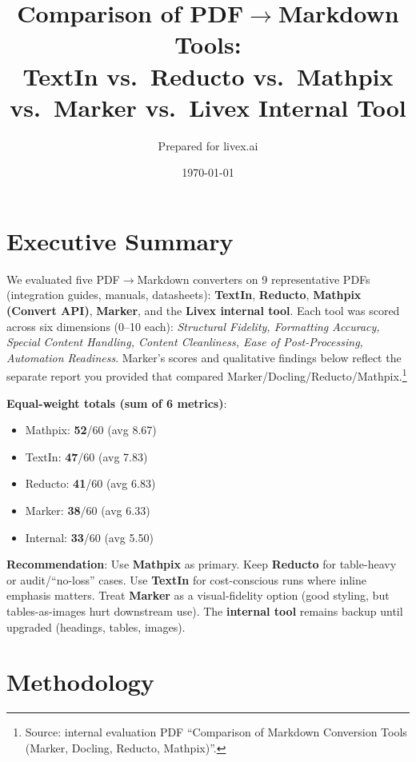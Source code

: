 \documentclass[11pt,a4paper]{article}
\title{Comparison of PDF\texorpdfstring{$\to$}{->}Markdown Tools:\\
TextIn vs.\ Reducto vs.\ Mathpix vs.\ Marker vs.\ Livex Internal Tool}
\author{Prepared for livex.ai}
\date{\today}
\begin{document}
\maketitle

\section*{Executive Summary}

We evaluated five PDF$\to$Markdown converters on 9 representative PDFs (integration guides, manuals, datasheets):
\textbf{TextIn}, \textbf{Reducto}, \textbf{Mathpix (Convert API)}, \textbf{Marker}, and the \textbf{Livex internal tool}.
Each tool was scored across six dimensions (0--10 each): \emph{Structural Fidelity, Formatting Accuracy, Special Content Handling, Content Cleanliness, Ease of Post-Processing, Automation Readiness}.
Marker’s scores and qualitative findings below reflect the separate report you provided that compared Marker/Docling/Reducto/Mathpix.\footnote{Source: internal evaluation PDF “Comparison of Markdown Conversion Tools (Marker, Docling, Reducto, Mathpix)”.}

\smallskip
\noindent\textbf{Equal-weight totals (sum of 6 metrics)}:
\begin{itemize}[leftmargin=1.2em]
  \item Mathpix: \textbf{52}/60 (avg 8.67)
  \item TextIn: \textbf{47}/60 (avg 7.83)
  \item Reducto: \textbf{41}/60 (avg 6.83)
  \item Marker: \textbf{38}/60 (avg 6.33)
  \item Internal: \textbf{33}/60 (avg 5.50)
\end{itemize}

\noindent\textbf{Recommendation}: Use \textbf{Mathpix} as primary. Keep \textbf{Reducto} for table-heavy or audit/“no-loss” cases. Use \textbf{TextIn} for cost-conscious runs where inline emphasis matters. Treat \textbf{Marker} as a visual-fidelity option (good styling, but tables-as-images hurt downstream use). The \textbf{internal tool} remains backup until upgraded (headings, tables, images).

\section*{Methodology}
\end{document}
